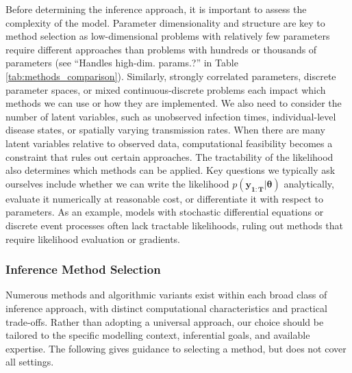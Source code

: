 \documentclass{article}
\begin{document}
Before determining the inference approach, it is important to assess the complexity of the model.
Parameter dimensionality and structure are key to method selection as low-dimensional problems with relatively few parameters require different approaches than problems with hundreds or thousands of parameters (see ``Handles high-dim. params.?'' in Table \ref{tab:methods_comparison}).
Similarly, strongly correlated parameters, discrete parameter spaces, or mixed continuous-discrete problems each impact which methods we can use or how they are implemented.
We also need to consider the number of latent variables, such as unobserved infection times, individual-level disease states, or spatially varying transmission rates.
When there are many latent variables relative to observed data, computational feasibility becomes a constraint that rules out certain approaches.
The tractability of the likelihood also determines which methods can be applied.
Key questions we typically ask ourselves include whether we can write the likelihood $p(\boldsymbol{y_{1:T}}|\boldsymbol{\theta})$ analytically, evaluate it numerically at reasonable cost, or differentiate it with respect to parameters.
As an example, models with stochastic differential equations or discrete event processes often lack tractable likelihoods, ruling out methods that require likelihood evaluation or gradients.

\subsubsection{Inference Method Selection}

Numerous methods and algorithmic variants exist within each broad class of inference approach, with distinct computational characteristics and practical trade-offs.
Rather than adopting a universal approach, our choice should be tailored to the specific modelling context, inferential goals, and available expertise.
The following gives guidance to selecting a method, but does not cover all settings.
\end{document}
